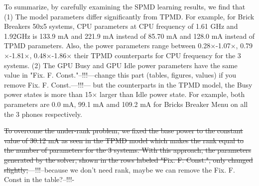 {\color{blue}To summarize, by carefully examining the SPMD learning results, we find that }(1) The model parameters differ significantly from
TPMD. For example, for Brick Breakers 50x5 systems, CPU parameters at CPU frequency of
1.61 GHz and 1.92GHz is 133.9 mA and 221.9 mA instead of 85.70 mA and 128.0 mA instead of
TPMD parameters. Also, the power parameters range between
0.28$\times$-1.07$\times$,
0.79$\times$-1.81$\times$,
0.48$\times$-1.86$\times$ their
TPMD counterparts for CPU frequency for the 3 systems.
(2) The GPU Busy and GPU Idle power parameters have the same value in "Fix. F. Const."{\color{blue}--!!!---change this part (tables, figures, values) if you remove Fix. F. Const.---!!!---}
but the counterparts in the TPMD model, the Busy power states is more than 15$\times$
larger than Idle power state.
For example, both parameters are 0.0 mA, 99.1 mA amd 109.2 mA for Bricks Breaker Menu
on all the 3 phones respectively.

\st{To overcome the under-rank problem, we fixed the base power to the
constant value of 30.12 mA as seen in the TPMD model which makes the
rank equal to the number of parameters for the 3 systems. 
With this approach, the parameters generated by the solver, 
shown in the rows labeled "Fix. F. Const.",
only changed slightly;}{\color{blue}---!!!--because we don't need rank, maybe we can remove the Fix. F. Const in the table?--!!!-} 

